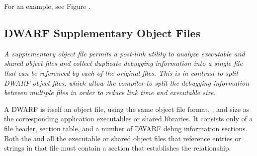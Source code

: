 For an example, see Figure .

\subsection{DWARF Supplementary Object Files}
\label{datarep:dwarfsupplemetaryobjectfiles}
\textit{A supplementary object file permits a post-link utility to analyze executable and
shared object files and collect duplicate debugging information into a single file that
can be referenced by each of the original files.  This is in contrast to split DWARF
object files, which allow the compiler to split the debugging information between
multiple files in order to reduce link time and executable size.}

A DWARF  is itself an object file, 
using the same object
file format, \byteorder{}, and size as the corresponding application executables
or shared libraries. It consists only of a file header, section table, and
a number of DWARF debug information sections.  Both the 
and all the executable or shared object files that reference entries or strings in that
file must contain a \dotdebugsup{} section that establishes the relationship.

